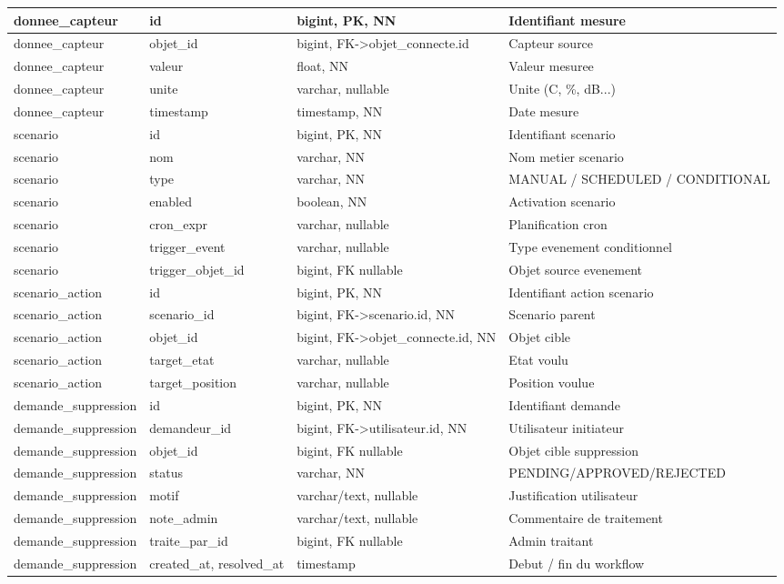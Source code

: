 \documentclass[11pt,a4paper]{article}
\begin{document}
\begin{longtable}{|p{3.0cm}|p{4.0cm}|p{4.1cm}|p{4.7cm}|}
donnee\_capteur & id & bigint, PK, NN & Identifiant mesure \\
\hline
donnee\_capteur & objet\_id & bigint, FK->objet\_connecte.id & Capteur source \\
\hline
donnee\_capteur & valeur & float, NN & Valeur mesuree \\
\hline
donnee\_capteur & unite & varchar, nullable & Unite (C, \%, dB...) \\
\hline
donnee\_capteur & timestamp & timestamp, NN & Date mesure \\
\hline

scenario & id & bigint, PK, NN & Identifiant scenario \\
\hline
scenario & nom & varchar, NN & Nom metier scenario \\
\hline
scenario & type & varchar, NN & MANUAL / SCHEDULED / CONDITIONAL \\
\hline
scenario & enabled & boolean, NN & Activation scenario \\
\hline
scenario & cron\_expr & varchar, nullable & Planification cron \\
\hline
scenario & trigger\_event & varchar, nullable & Type evenement conditionnel \\
\hline
scenario & trigger\_objet\_id & bigint, FK nullable & Objet source evenement \\
\hline

scenario\_action & id & bigint, PK, NN & Identifiant action scenario \\
\hline
scenario\_action & scenario\_id & bigint, FK->scenario.id, NN & Scenario parent \\
\hline
scenario\_action & objet\_id & bigint, FK->objet\_connecte.id, NN & Objet cible \\
\hline
scenario\_action & target\_etat & varchar, nullable & Etat voulu \\
\hline
scenario\_action & target\_position & varchar, nullable & Position voulue \\
\hline

demande\_suppression & id & bigint, PK, NN & Identifiant demande \\
\hline
demande\_suppression & demandeur\_id & bigint, FK->utilisateur.id, NN & Utilisateur initiateur \\
\hline
demande\_suppression & objet\_id & bigint, FK nullable & Objet cible suppression \\
\hline
demande\_suppression & status & varchar, NN & PENDING/APPROVED/REJECTED \\
\hline
demande\_suppression & motif & varchar/text, nullable & Justification utilisateur \\
\hline
demande\_suppression & note\_admin & varchar/text, nullable & Commentaire de traitement \\
\hline
demande\_suppression & traite\_par\_id & bigint, FK nullable & Admin traitant \\
\hline
demande\_suppression & created\_at, resolved\_at & timestamp & Debut / fin du workflow \\
\hline

\end{longtable}
\end{document}
